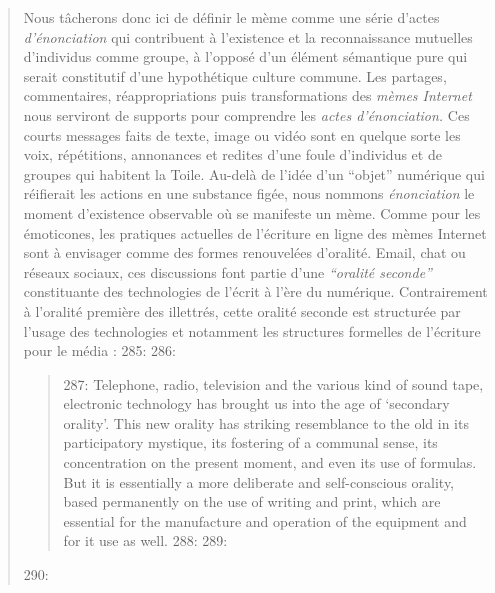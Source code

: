 \begin{quote}
Nous t\^acherons donc ici de d\'efinir le m\`eme comme une s\'erie d{\textquoteright}actes \textit{d{\textquoteright}\'enonciation }qui contribuent \`a l{\textquoteright}existence et la reconnaissance mutuelles d{\textquoteright}individus comme groupe, \`a l{\textquoteright}oppos\'e d{\textquoteright}un \'el\'ement s\'emantique pure qui serait constitutif d{\textquoteright}une hypoth\'etique culture commune. Les partages, commentaires, r\'eappropriations puis transformations des \textit{m\`emes Internet }nous serviront de supports pour comprendre les \textit{actes d{\textquoteright}\'enonciation. }Ces courts messages faits de texte, image ou vid\'eo sont en quelque sorte les voix, r\'ep\'etitions, annonances et redites d{\textquoteright}une foule d{\textquoteright}individus et de groupes qui habitent la Toile. Au-del\`a de l{\textquoteright}id\'ee d{\textquoteright}un {\textquotedblleft}objet{\textquotedblright} num\'erique qui r\'eifierait les actions en une substance fig\'ee, nous nommons \textit{\'enonciation} le moment d{\textquoteright}existence observable o\`u se manifeste un m\`eme. Comme pour les \'emoticones, les pratiques actuelles de l{\textquoteright}\'ecriture en ligne des m\`emes Internet sont \`a envisager comme des formes renouvel\'ees d{\textquoteright}oralit\'e. Email, chat ou r\'eseaux sociaux, ces discussions font partie d{\textquoteright}une \textit{{\textquotedblleft}oralit\'e seconde{\textquotedblright} }\cite{Ong1982} constituante des technologies de l{\textquoteright}\'ecrit \`a l{\textquoteright}\`ere du num\'erique. Contrairement \`a l{\textquoteright}oralit\'e premi\`ere des illettr\'es, cette oralit\'e seconde est structur\'ee par l{\textquoteright}usage des technologies et notamment les structures formelles de l{\textquoteright}\'ecriture pour le m\'edia :  
285: 
286: \begin{quote}
287: Telephone, radio, television and the various kind of sound tape, electronic technology has brought us into the age of {\textquoteleft}secondary orality{\textquoteright}. This new orality has striking resemblance to the old in its participatory mystique, its fostering of a communal sense, its concentration on the present moment, and even its use of formulas. But it is essentially a more deliberate and self-conscious orality, based permanently on the use of writing and print, which are essential for the manufacture and operation of the equipment and for it use as well. 
288: \cite{Ong1982}
289: \end{quote}
290: 

\end{quote}
